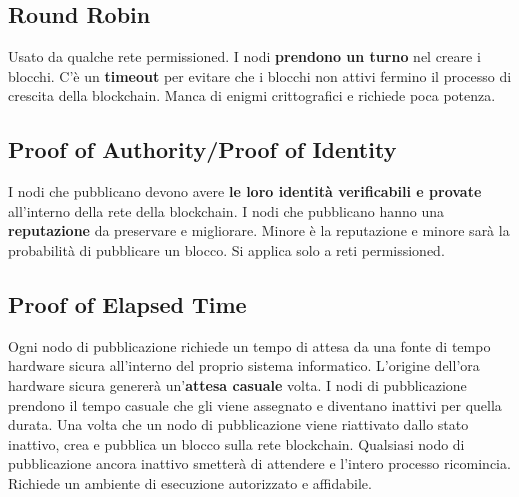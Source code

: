 \subsection{Round Robin}
Usato da qualche rete permissioned. I nodi \textbf{prendono un turno} nel creare i blocchi. C'è un \textbf{timeout} per evitare che i blocchi non attivi fermino il processo di crescita della blockchain. Manca di enigmi crittografici e richiede poca potenza.

\subsection{Proof of Authority/Proof of Identity}
I nodi che pubblicano devono avere \textbf{le loro identità verificabili e provate} all'interno della rete della blockchain. I nodi che pubblicano hanno una \textbf{reputazione} da preservare e migliorare. Minore è la reputazione e minore sarà la probabilità di pubblicare un blocco. Si applica solo a reti permissioned. 

\subsection{Proof of Elapsed Time}
Ogni nodo di pubblicazione richiede un tempo di attesa da una fonte di tempo hardware sicura all'interno del proprio sistema informatico. L'origine dell'ora hardware sicura genererà un'\textbf{attesa casuale}
volta. I nodi di pubblicazione prendono il tempo casuale che gli viene assegnato e
diventano inattivi per quella durata. Una volta che un nodo di pubblicazione viene riattivato dallo stato inattivo, crea e pubblica un blocco sulla rete blockchain. Qualsiasi nodo di pubblicazione ancora inattivo smetterà di attendere e l'intero processo ricomincia. Richiede un ambiente di esecuzione autorizzato e affidabile.





